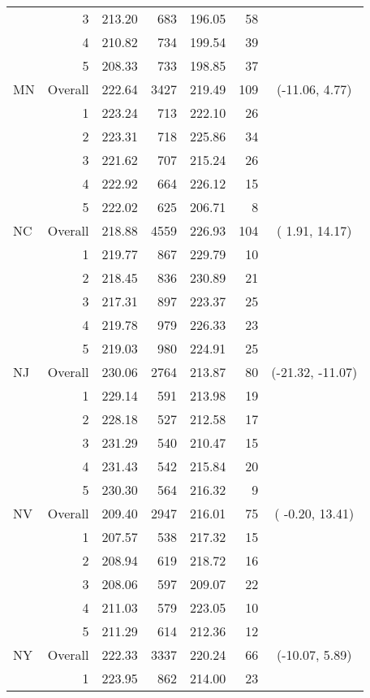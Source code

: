 \begin{longtable}{lrrr@{\extracolsep{.25cm}}rrc}
   & 3 & 213.20 & 683 & 196.05 &  58 &  \\ 
   & 4 & 210.82 & 734 & 199.54 &  39 &  \\ 
   & 5 & 208.33 & 733 & 198.85 &  37 &  \\ 
   \hline
MN & Overall & 222.64 & 3427 & 219.49 & 109 & (-11.06,   4.77) \\ 
   & 1 & 223.24 & 713 & 222.10 &  26 &  \\ 
   & 2 & 223.31 & 718 & 225.86 &  34 &  \\ 
   & 3 & 221.62 & 707 & 215.24 &  26 &  \\ 
   & 4 & 222.92 & 664 & 226.12 &  15 &  \\ 
   & 5 & 222.02 & 625 & 206.71 &   8 &  \\ 
   \hline
NC & Overall & 218.88 & 4559 & 226.93 & 104 & (  1.91,  14.17) \\ 
   & 1 & 219.77 & 867 & 229.79 &  10 &  \\ 
   & 2 & 218.45 & 836 & 230.89 &  21 &  \\ 
   & 3 & 217.31 & 897 & 223.37 &  25 &  \\ 
   & 4 & 219.78 & 979 & 226.33 &  23 &  \\ 
   & 5 & 219.03 & 980 & 224.91 &  25 &  \\ 
   \hline
NJ & Overall & 230.06 & 2764 & 213.87 &  80 & (-21.32, -11.07) \\ 
   & 1 & 229.14 & 591 & 213.98 &  19 &  \\ 
   & 2 & 228.18 & 527 & 212.58 &  17 &  \\ 
   & 3 & 231.29 & 540 & 210.47 &  15 &  \\ 
   & 4 & 231.43 & 542 & 215.84 &  20 &  \\ 
   & 5 & 230.30 & 564 & 216.32 &   9 &  \\ 
   \hline
NV & Overall & 209.40 & 2947 & 216.01 &  75 & ( -0.20,  13.41) \\ 
   & 1 & 207.57 & 538 & 217.32 &  15 &  \\ 
   & 2 & 208.94 & 619 & 218.72 &  16 &  \\ 
   & 3 & 208.06 & 597 & 209.07 &  22 &  \\ 
   & 4 & 211.03 & 579 & 223.05 &  10 &  \\ 
   & 5 & 211.29 & 614 & 212.36 &  12 &  \\ 
   \hline
NY & Overall & 222.33 & 3337 & 220.24 &  66 & (-10.07,   5.89) \\ 
   & 1 & 223.95 & 862 & 214.00 &  23 &  \\ 

\end{longtable}
